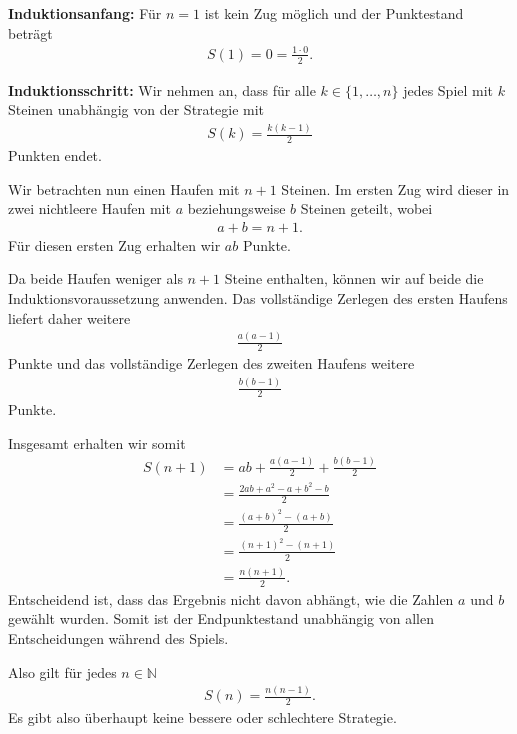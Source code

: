 \documentclass[a4paper,10pt]{article}
\newcommand{\N}{\mathbb{N}}
\begin{document}
{\begin{enumerate}[label=(\alph*)]
    \textbf{Induktionsanfang:}
    Für $n=1$ ist kein Zug möglich und der Punktestand beträgt
    \begin{align*}
        S(1)=0=\frac{1\cdot0}{2}.
    \end{align*}

    \textbf{Induktionsschritt:}
    Wir nehmen an, dass für alle $k\in\{1,\ldots,n\}$ jedes Spiel mit $k$ Steinen unabhängig von der Strategie mit
    \begin{align*}
        S(k)=\frac{k(k-1)}{2}
    \end{align*}
    Punkten endet.

    Wir betrachten nun einen Haufen mit $n+1$ Steinen. Im ersten Zug wird dieser in zwei nichtleere Haufen mit $a$ beziehungsweise $b$ Steinen geteilt, wobei
    \begin{align*}
        a+b=n+1.
    \end{align*}
    Für diesen ersten Zug erhalten wir $ab$ Punkte.

    Da beide Haufen weniger als $n+1$ Steine enthalten, können wir auf beide die Induktionsvoraussetzung anwenden. Das vollständige Zerlegen des ersten Haufens liefert daher weitere
    \begin{align*}
        \frac{a(a-1)}{2}
    \end{align*}
    Punkte und das vollständige Zerlegen des zweiten Haufens weitere
    \begin{align*}
        \frac{b(b-1)}{2}
    \end{align*}
    Punkte.

    Insgesamt erhalten wir somit
    \begin{align*}
        S(n+1)
        &=ab+\frac{a(a-1)}{2}+\frac{b(b-1)}{2}\\
        &=\frac{2ab+a^2-a+b^2-b}{2}\\
        &=\frac{(a+b)^2-(a+b)}{2}\\
        &=\frac{(n+1)^2-(n+1)}{2}\\
        &=\frac{n(n+1)}{2}.
    \end{align*}
    Entscheidend ist, dass das Ergebnis nicht davon abhängt, wie die Zahlen $a$ und $b$ gewählt wurden. Somit ist der Endpunktestand unabhängig von allen Entscheidungen während des Spiels.

    Also gilt für jedes $n\in\N$
    \begin{align*}
        S(n)=\frac{n(n-1)}{2}.
    \end{align*}
    Es gibt also überhaupt keine bessere oder schlechtere Strategie.


\end{enumerate}}
\end{document}
